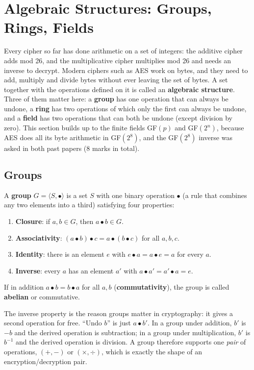 \section{Algebraic Structures: Groups, Rings, Fields \hothot}\label{sec:algebra}

Every cipher so far has done arithmetic on a set of integers: the additive cipher adds mod 26, and the multiplicative cipher multiplies mod 26 and needs an inverse to decrypt. Modern ciphers such as AES work on bytes, and they need to add, multiply and divide bytes without ever leaving the set of bytes. A set together with the operations defined on it is called an \textbf{algebraic structure}. Three of them matter here: a \textbf{group} has one operation that can always be undone, a \textbf{ring} has two operations of which only the first can always be undone, and a \textbf{field} has two operations that can both be undone (except division by zero). This section builds up to the finite fields GF$(p)$ and GF$(2^n)$, because AES does all its byte arithmetic in GF$(2^8)$, and the GF$(2^8)$ inverse was asked in both past papers (8 marks in total).

\subsection{Groups}
A \textbf{group} $G = \langle S, \bullet \rangle$ is a set $S$ with one binary operation $\bullet$ (a rule that combines any two elements into a third) satisfying four properties:
\begin{enumerate}[nosep]
  \item \textbf{Closure}: if $a, b \in G$, then $a \bullet b \in G$.
  \item \textbf{Associativity}: $(a \bullet b) \bullet c = a \bullet (b \bullet c)$ for all $a, b, c$.
  \item \textbf{Identity}: there is an element $e$ with $e \bullet a = a \bullet e = a$ for every $a$.
  \item \textbf{Inverse}: every $a$ has an element $a'$ with $a \bullet a' = a' \bullet a = e$.
\end{enumerate}
If in addition $a \bullet b = b \bullet a$ for all $a, b$ (\textbf{commutativity}), the group is called \textbf{abelian} or commutative.

The inverse property is the reason groups matter in cryptography: it gives a second operation for free. ``Undo $b$'' is just $a \bullet b'$. In a group under addition, $b'$ is $-b$ and the derived operation is subtraction; in a group under multiplication, $b'$ is $b^{-1}$ and the derived operation is division. A group therefore supports one \emph{pair} of operations, $(+, -)$ or $(\times, \div)$, which is exactly the shape of an encryption/decryption pair.

